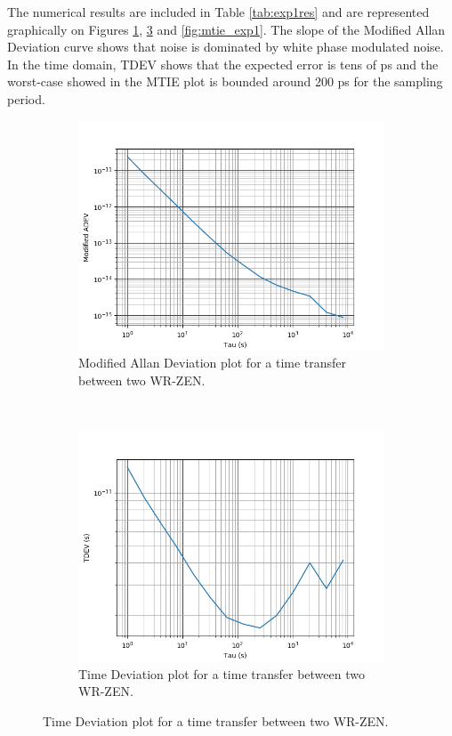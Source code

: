 The numerical results are included in Table \ref{tab:exp1res} and are 
represented graphically on Figures \ref{fig:mdev_exp1}, 
\ref{fig:tdev_exp1} and \ref{fig:mtie_exp1}. The slope of the Modified Allan 
Deviation curve shows that noise is dominated by white phase modulated noise. 
In the time domain, TDEV shows that the expected error is tens of ps and the 
worst-case showed in the MTIE plot is bounded around 200 ps for the sampling 
period. 

\begin{figure}
	\centering
	\begin{subfigure}[t]{0.48\textwidth}
		\includegraphics[width=\textwidth]{img/mdev_exp1}
		\caption[MDEV plot for the WR-ZEN]{Modified Allan Deviation plot for a 
		time transfer between two WR-ZEN.}
		\label{fig:mdev_exp1}
	\end{subfigure}
	~ %
	\begin{subfigure}[t]{0.48\textwidth}
		\includegraphics[width=\textwidth]{img/tdev_exp1}
		\caption[TDEV plot for the WR-ZEN]{Time Deviation plot for a time 
		transfer between two WR-ZEN.}
		\label{fig:tdev_exp1}
	\end{subfigure}
\end{figure}

